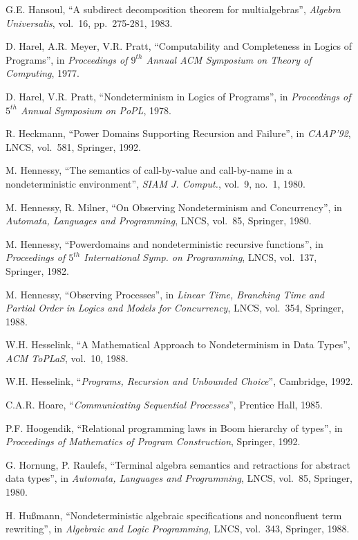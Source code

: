 G.E. Hansoul, ``A subdirect decomposition theorem for 
multialgebras'', {\em Algebra Universalis}, vol.~16, pp.~275-281, 1983.

 D. Harel, A.R. Meyer, V.R. Pratt, ``Computability and 
Completeness in Logics of Programs'', in {\em Proceedings of $9^{th}$ Annual 
ACM Symposium on Theory of Computing}, 1977.

 D. Harel, V.R. Pratt, ``Nondeterminism in Logics of 
Programs'', in {\em Proceedings of $5^{th}$ Annual Symposium on PoPL}, 1978.

 R. Heckmann, ``Power Domains Supporting Recursion and 
Failure'', in {\em CAAP'92}, LNCS, vol.~581, Springer, 1992.

 M. Hennessy, ``The semantics of call-by-value and 
call-by-name in a nondeterministic environment'', {\em SIAM J. Comput.}, 
vol.~9, no.~1, 1980.

 M. Hennessy, R. Milner, ``On Observing Nondeterminism 
and Concurrency'', in {\em Automata, Languages and Programming}, LNCS, 
vol.~85, Springer, 1980.

 M. Hennessy, ``Powerdomains and nondeterministic 
recursive functions'', in {\em Proceedings of $5^{th}$ International Symp.  on 
Programming}, LNCS, vol.~137, Springer, 1982.

 M. Hennessy, ``Observing Processes'', in {\em Linear 
Time, Branching Time and Partial Order in Logics and Models for 
Concurrency}, LNCS, vol.~354, Springer, 1988.

 W.H. Hesselink, ``A Mathematical Approach to 
Nondeterminism in Data Types'', {\em ACM ToPLaS}, vol.~10, 1988.

 W.H. Hesselink, ``{\em Programs, Recursion and 
Unbounded Choice}'', Cambridge, 1992.

 C.A.R. Hoare, ``{\em Communicating Sequential 
Processes}'', Prentice Hall, 1985.

 P.F. Hoogendik, ``Relational programming laws in Boom 
hierarchy of types'', in {\em Proceedings of Mathematics of Program 
Construction}, Springer, 1992.

 G. Hornung, P. Raulefs, ``Terminal algebra semantics and 
retractions for abstract data types'', in {\em Automata, Languages and 
Programming}, LNCS, vol.~85, Springer, 1980.

 H. Hu{\ss}mann, ``Nondeterministic algebraic 
specifications and nonconfluent term rewriting'', in {\em Algebraic and 
Logic Programming}, LNCS, vol.~343, Springer, 1988.

